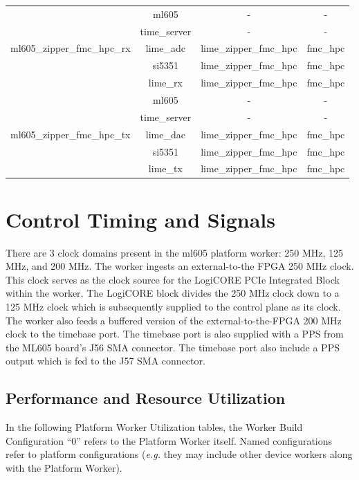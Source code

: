 \documentclass{article}
\edef\ecomp{ml605}
\begin{document}
\begin{tabular}{|c|c|c|c|}
		\hline
		\multirow{5}{*}{ml605\_zipper\_fmc\_hpc\_rx} &ml605 & - & - \\ &time\_server & - & - \\ &lime\_adc & lime\_zipper\_fmc\_hpc & fmc\_hpc \\  &si5351 & lime\_zipper\_fmc\_hpc & fmc\_hpc \\ &lime\_rx & lime\_zipper\_fmc\_hpc & fmc\_hpc \\
		\hline
		\multirow{5}{*}{ml605\_zipper\_fmc\_hpc\_tx} &ml605 & - & - \\ &time\_server & - & - \\ &lime\_dac & lime\_zipper\_fmc\_hpc & fmc\_hpc \\  &si5351 & lime\_zipper\_fmc\_hpc & fmc\_hpc \\ &lime\_tx & lime\_zipper\_fmc\_hpc & fmc\_hpc \\
		\hline
	\end{tabular}
	\section*{Control Timing and Signals}
	There are 3 clock domains present in the ml605 platform worker: 250 MHz, 125 MHz, and 200 MHz. The worker ingests an external-to-the FPGA 250 MHz clock. This clock serves as the clock source for the LogiCORE PCIe Integrated Block within the worker. The LogiCORE block divides the 250 MHz clock down to a 125 MHz clock which is subsequently supplied to the control plane as its clock. The worker also feeds a buffered version of the external-to-the-FPGA 200 MHz clock to the timebase port. The timebase port is also supplied with a PPS from the ML605 board's J56 SMA connector. The timebase port also include a PPS output which is fed to the J57 SMA connector.

\begin{landscape}
\section*{Performance and Resource Utilization}
In the following Platform Worker Utilization tables, the Worker Build Configuration ``0'' refers to the Platform Worker itself. Named configurations refer to platform configurations (\textit{e.g.} they may include other device workers along with the Platform Worker).\\\\

\end{landscape}
\end{document}
